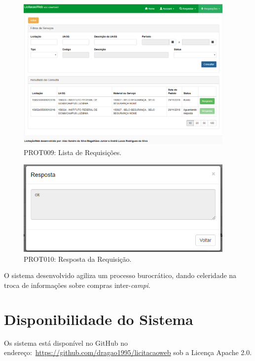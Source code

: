 \begin{figure}[H]
	\centering
	\includegraphics[width=0.95\textwidth]{figuras/prototipo009.png}
	\caption[PROT009: Lista de Requisições]{PROT009: Lista de Requisições.}
\end{figure}

\begin{figure}[H]
	\centering
	\includegraphics[width=0.95\textwidth]{figuras/prototipo010.png}
	\caption[PROT010: Resposta da Requisição]{PROT010: Resposta da Requisição.}
\end{figure}

O sistema desenvolvido agiliza um processo burocrático, dando celeridade na troca de informações sobre compras inter-\textit{campi}.


\section{Disponibilidade do Sistema}

Os sistema está disponível no GitHub no endereço:~\url{https://github.com/dragao1995/licitacaoweb} sob a Licença Apache 2.0.




